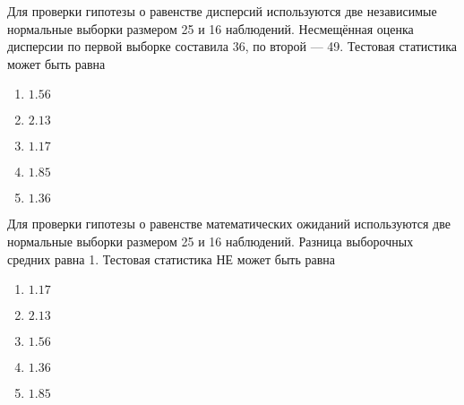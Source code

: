 \documentclass[t]{beamer}
\begin{document}
 \begin{frame} \label{3} 
\begin{block}{3} 

  Для проверки гипотезы о равенстве дисперсий используются две независимые нормальные выборки размером 25 и 16 наблюдений. Несмещённая оценка дисперсии по первой выборке составила 36, по второй — 49. Тестовая статистика может быть равна


 \end{block} 
\begin{enumerate} 
\item[] \hyperlink{3-No}{\beamergotobutton{} $1.56$}
\item[] \hyperlink{3-No}{\beamergotobutton{} $2.13$}
\item[] \hyperlink{3-No}{\beamergotobutton{} $1.17$}
\item[] \hyperlink{3-No}{\beamergotobutton{} $1.85$}
\item[] \hyperlink{3-Yes}{\beamergotobutton{} $1.36$}
\end{enumerate} 
\end{frame} 


 \begin{frame} \label{4} 
\begin{block}{4} 

  Для проверки гипотезы о равенстве математических ожиданий используются две нормальные выборки размером 25 и 16 наблюдений. Разница выборочных средних равна 1. Тестовая статистика НЕ может быть равна


 \end{block} 
\begin{enumerate} 
\item[] \hyperlink{4-No}{\beamergotobutton{} $1.17$}
\item[] \hyperlink{4-No}{\beamergotobutton{} $2.13$}
\item[] \hyperlink{4-No}{\beamergotobutton{} $1.56$}
\item[] \hyperlink{4-No}{\beamergotobutton{} $1.36$}
\item[] \hyperlink{4-No}{\beamergotobutton{} $1.85$}
\end{enumerate} 
\end{frame} 
\end{document}
